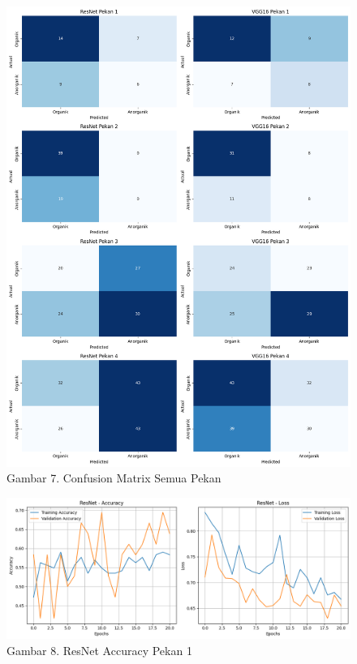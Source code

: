 \documentclass[12pt,a4paper]{article}
\begin{document}
\begin{adjustwidth}{3em}{0pt}
\begin{figure}[H]
    \centering
    \includegraphics[width=1\linewidth]{Images/confusionmatrix.png}
    \caption*{Gambar 7. Confusion Matrix Semua Pekan}
    \label{fig:dataset_collection}
\end{figure}

\begin{figure}[H]
    \centering
    \includegraphics[width=1\linewidth]{Images/akurasipekan1resnet.png}
    \caption*{Gambar 8.  ResNet Accuracy Pekan 1}
    \label{fig:dataset_collection}
\end{figure}


\end{adjustwidth}
\end{document}

